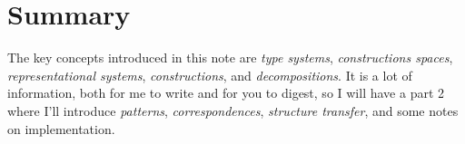\documentclass[a4paper]{article}
\theoremstyle{definition}
\newtheorem{definition}{Definition}
\begin{document}
		\section{Summary}
		The key concepts introduced in this note are \textit{type systems}, \textit{constructions spaces}, \textit{representational systems}, \textit{constructions}, and \textit{decompositions}. It is a lot of information, both for me to write and for you to digest, so I will have a part 2 where I'll introduce \textit{patterns}, \textit{correspondences}, \textit{structure transfer}, and some notes on implementation.
		
%		
%		
\end{document}
